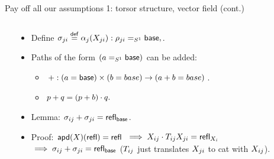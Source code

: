 \begin{frame}{Pay off all our assumptions 1: torsor structure, vector field (cont.)}
\begin{columns}
\begin{column}{0.15\textwidth}

\end{column}
\begin{column}{0.5\textwidth}
\begin{itemize}
\item<2-> Define \( \sigma_{ji}\stackrel{\mathsf{def}}{=} \alpha_j(X_{ji}):\rho_{ji}=_{S^1}\mathsf{base}, \).
\item<3-> Paths of the form \( (a=_{S^1}\mathsf{base}) \) can be added: 
\begin{itemize}
\item \( +:(a=\mathsf{base})\times (b=base)\to (a+ b=base) \).
\item \( p+ q=(p+ b)\cdot q. \)
\end{itemize}
\item<4-> Lemma: \( \sigma_{ij}+\sigma_{ji}=\mathsf{refl}_{\mathsf{base}} \).
\item<5-> Proof: \( \mathsf{apd}(X)(\mathsf{refl})=\mathsf{refl}\) \(\implies X_{ij}\cdot T_{ij}X_{ji}=\mathsf{refl}_{X_i}\) \(\implies\sigma_{ij}+\sigma_{ji}=\mathsf{refl}_{\mathsf{base}} \) (\( T_{ij} \) just translates \( X_{ji} \) to cat with \( X_{ij} \)).
\end{itemize}
\end{column}
\begin{column}{0.35\textwidth}
\end{column}
\end{columns}
\end{frame}

